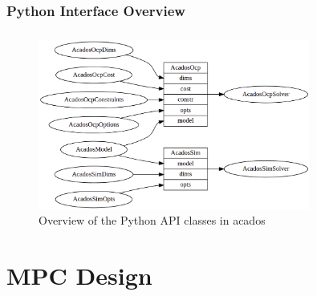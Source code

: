 \documentclass{thesisbeamer}
\newcommand\Fontvi{\fontsize{9}{10}\selectfont}
\begin{document}
\begin{frame}
	\frametitle{Python Interface Overview}
	\Fontvi
		
	\begin{figure}[h]
 		\centering
 		\includegraphics[width=0.8\textwidth]{Images/acados/python_interface.png}
 		\caption{Overview of the Python API classes in acados\protect\footnotemark}
 		\label{fig:python_interface}
 	\end{figure}
\end{frame}



\section{MPC Design}

%	
%	
%
\end{document}
